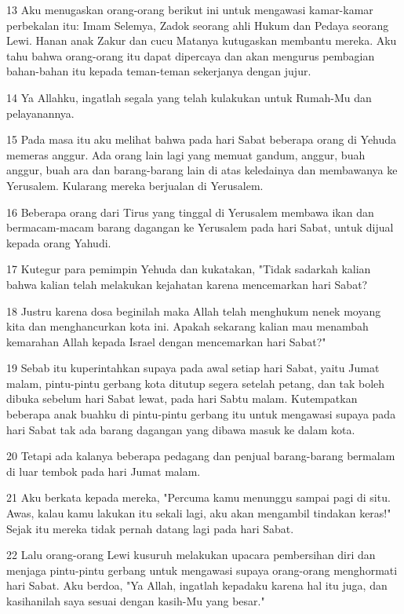 \par 13 Aku menugaskan orang-orang berikut ini untuk mengawasi kamar-kamar perbekalan itu: Imam Selemya, Zadok seorang ahli Hukum dan Pedaya seorang Lewi. Hanan anak Zakur dan cucu Matanya kutugaskan membantu mereka. Aku tahu bahwa orang-orang itu dapat dipercaya dan akan mengurus pembagian bahan-bahan itu kepada teman-teman sekerjanya dengan jujur.
\par 14 Ya Allahku, ingatlah segala yang telah kulakukan untuk Rumah-Mu dan pelayanannya.
\par 15 Pada masa itu aku melihat bahwa pada hari Sabat beberapa orang di Yehuda memeras anggur. Ada orang lain lagi yang memuat gandum, anggur, buah anggur, buah ara dan barang-barang lain di atas keledainya dan membawanya ke Yerusalem. Kularang mereka berjualan di Yerusalem.
\par 16 Beberapa orang dari Tirus yang tinggal di Yerusalem membawa ikan dan bermacam-macam barang dagangan ke Yerusalem pada hari Sabat, untuk dijual kepada orang Yahudi.
\par 17 Kutegur para pemimpin Yehuda dan kukatakan, "Tidak sadarkah kalian bahwa kalian telah melakukan kejahatan karena mencemarkan hari Sabat?
\par 18 Justru karena dosa beginilah maka Allah telah menghukum nenek moyang kita dan menghancurkan kota ini. Apakah sekarang kalian mau menambah kemarahan Allah kepada Israel dengan mencemarkan hari Sabat?"
\par 19 Sebab itu kuperintahkan supaya pada awal setiap hari Sabat, yaitu Jumat malam, pintu-pintu gerbang kota ditutup segera setelah petang, dan tak boleh dibuka sebelum hari Sabat lewat, pada hari Sabtu malam. Kutempatkan beberapa anak buahku di pintu-pintu gerbang itu untuk mengawasi supaya pada hari Sabat tak ada barang dagangan yang dibawa masuk ke dalam kota.
\par 20 Tetapi ada kalanya beberapa pedagang dan penjual barang-barang bermalam di luar tembok pada hari Jumat malam.
\par 21 Aku berkata kepada mereka, "Percuma kamu menunggu sampai pagi di situ. Awas, kalau kamu lakukan itu sekali lagi, aku akan mengambil tindakan keras!" Sejak itu mereka tidak pernah datang lagi pada hari Sabat.
\par 22 Lalu orang-orang Lewi kusuruh melakukan upacara pembersihan diri dan menjaga pintu-pintu gerbang untuk mengawasi supaya orang-orang menghormati hari Sabat. Aku berdoa, "Ya Allah, ingatlah kepadaku karena hal itu juga, dan kasihanilah saya sesuai dengan kasih-Mu yang besar."
